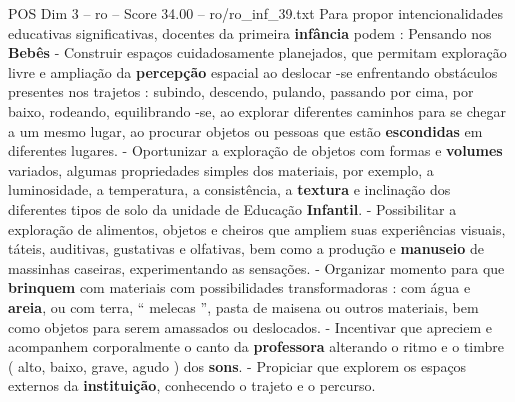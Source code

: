 \begin{textsample}{POS Dim 3 – ro – Score 34.00 – ro/ro\_inf\_39.txt}  \label{ex:f3_pos_131}
Para propor intencionalidades educativas significativas, docentes da primeira \textbf{infância} podem : Pensando nos \textbf{Bebês} - Construir espaços cuidadosamente planejados, que permitam exploração livre e ampliação da \textbf{percepção} espacial ao deslocar -se enfrentando obstáculos presentes nos trajetos : subindo, descendo, pulando, passando por cima, por baixo, rodeando, equilibrando -se, ao explorar diferentes caminhos para se chegar a um mesmo lugar, ao procurar objetos ou pessoas que estão \textbf{escondidas} em diferentes lugares. - Oportunizar a exploração de objetos com formas e \textbf{volumes} variados, algumas propriedades simples dos materiais, por exemplo, a luminosidade, a temperatura, a consistência, a \textbf{textura} e inclinação dos diferentes tipos de solo da unidade de Educação \textbf{Infantil}. - Possibilitar a exploração de alimentos, objetos e cheiros que ampliem suas experiências visuais, táteis, auditivas, gustativas e olfativas, bem como a produção e \textbf{manuseio} de massinhas caseiras, experimentando as sensações. - Organizar momento para que \textbf{brinquem} com materiais com possibilidades transformadoras : com água e \textbf{areia}, ou com terra, “ melecas ”, pasta de maisena ou outros materiais, bem como objetos para serem amassados ou deslocados. - Incentivar que apreciem e acompanhem corporalmente o canto da \textbf{professora} alterando o ritmo e o timbre ( alto, baixo, grave, agudo ) dos \textbf{sons}. - Propiciar que explorem os espaços externos da \textbf{instituição}, conhecendo o trajeto e o percurso.

\end{textsample}
